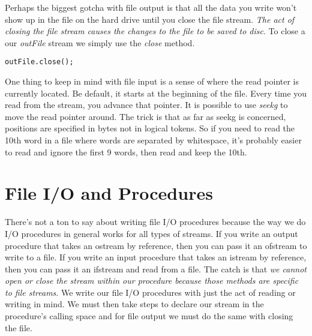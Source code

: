 \documentclass[nobib]{tufte-handout}
\begin{document}
Perhaps the biggest gotcha with file output is that all the data you write won't show up in the file on the hard drive until you close the file stream. \textit{The act of closing the file stream causes the changes to the file to be saved to disc}.  To close a our \textit{outFile} stream we simply use the \textit{close} method.
\begin{verbatim}
outFile.close();
\end{verbatim}


One thing to keep in mind with file input is a sense of where the read pointer is currently located.  Be default, it starts at the beginning of the file.  Every time you read from the stream, you advance that pointer.  It is possible to use \textit{seekg} to move the read pointer around. The trick is that as far as seekg is concerned, positions are specified in bytes not in logical tokens.  So if you need to read the 10th word in a file where words are separated by whitespace, it's probably easier to read and ignore the first 9 words, then read and keep the 10th.

\section{File I/O and Procedures}

There's not a ton to say about writing file I/O procedures because the way we do I/O procedures in general works for all types of streams.  If you write an output procedure that takes an ostream by reference, then you can pass it an ofstream to write to a file. If you write an input procedure that takes an istream by reference, then you can pass it an ifstream and read from a file.  The catch is that \textit{we cannot open or close the stream within our procedure because those methods are specific to file streams}.  We write our file I/O procedures with just the act of reading or writing in mind. We must then take steps to declare our stream in the procedure's calling space and for file output we must do the same with closing the file.
\end{document}
